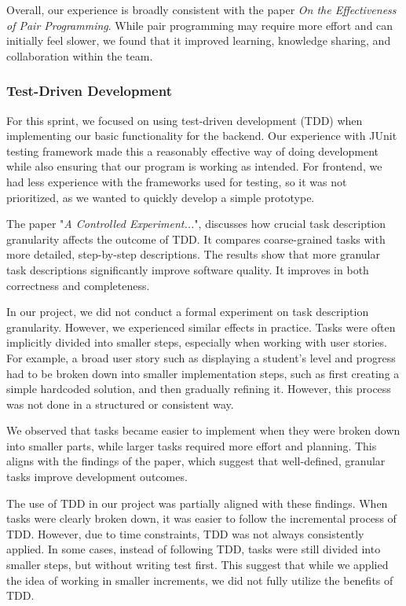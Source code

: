 Overall, our experience is broadly consistent with the paper \textit{On the Effectiveness of Pair Programming}\cite{Effectiveness_of_Pair_Programming}.
While pair programming may require more effort and can initially feel slower, we found that it improved learning,
knowledge sharing, and collaboration within the team. 

\subsubsection{Test-Driven Development}
For this sprint, we focused on using test-driven development (TDD) when implementing our basic functionality for the backend. Our experience with JUnit testing framework made this a reasonably effective way of doing development while also ensuring that our program is working as intended. For frontend, we had less experience with the frameworks used for testing, so it was not prioritized, as we wanted to quickly develop a simple prototype.

The paper "\textit{A Controlled Experiment...}"\cite{TDD}, discusses how crucial task description granularity affects the outcome of TDD.
It compares coarse-grained tasks with more detailed, step-by-step descriptions.
The results show that more granular task descriptions significantly improve software quality.
It improves in both correctness and completeness.

In our project, we did not conduct a formal experiment on task description granularity.
However, we experienced similar effects in practice.
Tasks were often implicitly divided into smaller steps, especially when working with user stories.
For example, a broad user story such as displaying a student’s level and progress had to be
broken down into smaller implementation steps, such as first creating a simple hardcoded solution,
and then gradually refining it.
However, this process was not done in a structured or consistent way.

We observed that tasks became easier to implement when they were broken down into smaller parts,
while larger tasks required more effort and planning.
This aligns with the findings of the paper, which suggest that well-defined, granular tasks improve development outcomes.

The use of TDD in our project was partially aligned with these findings.
When tasks were clearly broken down, it was easier to follow the incremental process of TDD.
However, due to time constraints, TDD was not always consistently applied.
In some cases, instead of following TDD, tasks were still divided into smaller steps,
but without writing test first.
This suggest that while we applied the idea of working in smaller increments, we did not fully utilize the benefits of TDD.

